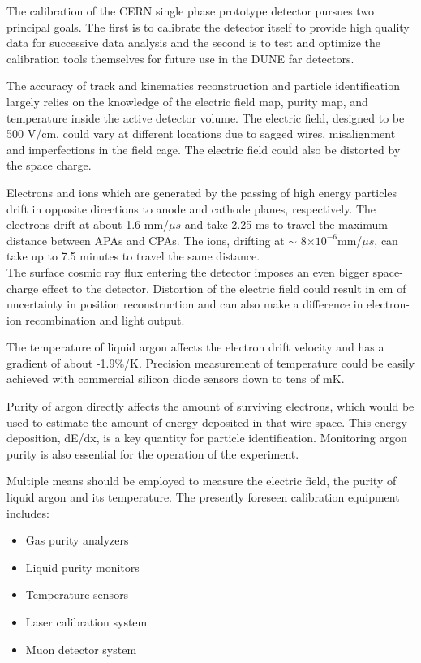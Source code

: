 \label{calibration}

The calibration of the CERN single phase prototype detector pursues two principal goals. The first is to calibrate the detector itself to
provide high quality data for successive data analysis and the second is to test and optimize the calibration tools themselves for future
use in the DUNE far detectors.

The accuracy of track and kinematics reconstruction and particle identification largely relies on the knowledge of the electric field map, purity map, and temperature inside the active detector volume. The electric field, designed to be 500 V/cm, could vary at different locations due to sagged wires, misalignment and imperfections in the field cage. The electric field could also be distorted by the space charge. 

Electrons and ions which are generated by the passing of high energy particles drift in opposite directions to anode and cathode planes, respectively. The electrons drift at about 1.6 mm/$\mu s$ and take 2.25 ms to travel the maximum distance between APAs and CPAs. The ions, drifting at $\sim$ 8$\times 10^{-6}$mm/$\mu s$, can take up to 7.5 minutes to travel the same distance. \\
The surface cosmic ray flux entering the detector imposes an even bigger space-charge effect to the detector. Distortion of the electric field could result in cm of uncertainty in position reconstruction and can also make a difference in electron-ion recombination and light output. 

The temperature of liquid argon affects the electron drift velocity and has a gradient of about -1.9\%/K. Precision measurement of temperature could be easily achieved with commercial silicon diode sensors down to tens of mK. 

Purity of argon directly affects the amount of surviving electrons, which would be used to estimate the amount of energy deposited in that wire space. This energy deposition, dE/dx, is a key quantity for particle identification. Monitoring argon purity is also essential for the operation of the experiment.

Multiple means should be employed to measure the electric field, the purity of liquid argon and its temperature. 
The presently foreseen calibration equipment includes:
\begin{itemize}
\item Gas purity analyzers
\item Liquid purity monitors
\item Temperature sensors
\item Laser calibration system
\item Muon detector system
\end{itemize}

